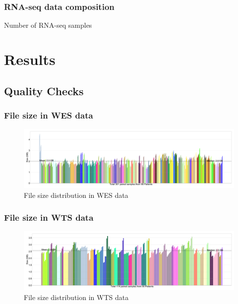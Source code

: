 \documentclass{beamer}
\begin{document}
        \begin{frame}
            \frametitle{RNA-seq data composition}

            \begin{table}
                \caption{Number of RNA-seq samples}
                \resizebox{!}{0.3 \textheight}
                {}
            \end{table}
        \end{frame}

    \section{Results}
        \subsection{Quality Checks}
            \begin{frame}
                \frametitle{File size in WES data}

                \begin{figure}
                    \includegraphics[width=0.9 \linewidth]{figures/Size/WES.pdf}
                    \caption{File size distribution in WES data}
                \end{figure}
            \end{frame}

            \begin{frame}
                \frametitle{File size in WTS data}

                \begin{figure}
                    \includegraphics[width=0.9 \linewidth]{figures/Size/WTS.pdf}
                    \caption{File size distribution in WTS data}
                \end{figure}
            \end{frame}
\end{document}
